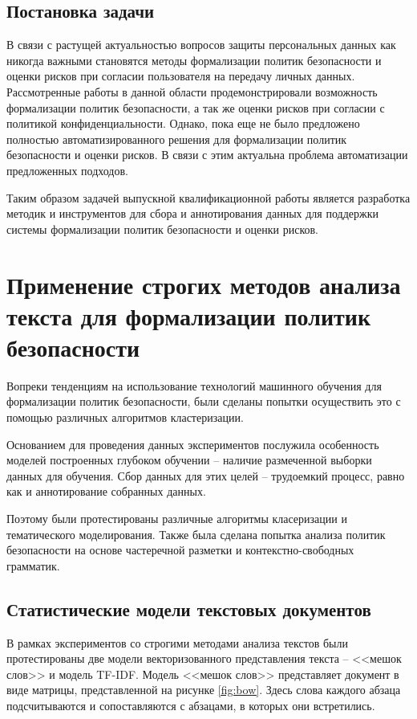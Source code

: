 \documentclass[../main]{subfiles}
\begin{document}
\subsection{Постановка задачи}
В связи с растущей актуальностью вопросов защиты персональных данных как никогда важными становятся методы формализации политик безопасности и оценки рисков при согласии пользователя на передачу личных данных. Рассмотренные работы в данной области продемонстрировали возможность формализации политик безопасности, а так же оценки рисков при согласии с политикой конфиденциальности. Однако, пока еще не было предложено полностью автоматизированного решения для формализации политик безопасности и оценки рисков. В связи с этим актуальна проблема автоматизации предложенных подходов. 

Таким образом задачей выпускной квалификационной работы является разработка методик и инструментов для сбора и аннотирования данных для поддержки системы формализации политик безопасности и оценки рисков.

\newpage
\section{Применение строгих методов анализа текста для формализации политик безопасности}

Вопреки тенденциям на использование технологий машинного обучения для формализации политик безопасности, были сделаны попытки осуществить это с помощью различных алгоритмов кластеризации.

Основанием для проведения данных экспериментов послужила особенность моделей построенных глубоком обучении -- наличие размеченной выборки данных для обучения. Сбор данных для этих целей -- трудоемкий процесс, равно как и аннотирование собранных данных.

Поэтому были протестированы различные алгоритмы класеризации и тематического моделирования. Также была сделана попытка анализа политик безопасности на основе частеречной разметки и контекстно-свободных грамматик.


\subsection{Статистические модели текстовых документов}

В рамках экспериментов со строгими методами анализа текстов были протестированы две модели векторизованного представления текста -- <<мешок слов>> и модель TF-IDF. Модель <<мешок слов>> представляет документ в виде матрицы, представленной на рисунке \ref{fig:bow}. Здесь слова каждого абзаца подсчитываются и сопоставляются с абзацами, в которых они встретились.
\end{document}
